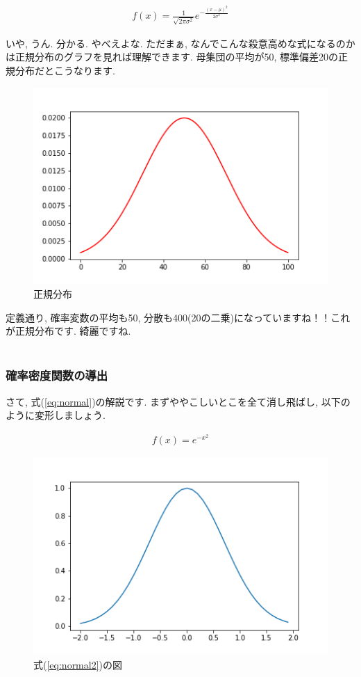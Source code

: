 \documentclass[11pt,a4paper,uplatex]{ujreport} 	%
\begin{document}
\begin{eqnarray}
\label{eq:normal}
f(x) = \frac{1}{\sqrt{2\pi\sigma^2}}e^{-\frac{(x-\mu)^2}{2\sigma^2}}
\end{eqnarray}

いや, うん. 分かる. やべえよな. ただまぁ, なんでこんな殺意高めな式になるのかは正規分布のグラフを見れば理解できます. 母集団の平均が50, 標準偏差20の正規分布だとこうなります.

\begin{figure}[H]
\label{im:normal}
  \centering
  \includegraphics[width=120mm,bb=0 0 432 288]{figures/normal.png}
  \caption{正規分布}
\end{figure}

定義通り, 確率変数の平均も50, 分散も400(20の二乗)になっていますね！！これが正規分布です. 綺麗ですね.\\
\\
\subsubsection{確率密度関数の導出}
さて, 式(\ref{eq:normal})の解説です. まずややこしいとこを全て消し飛ばし, 以下のように変形しましょう. 

\begin{eqnarray}
\label{eq:normal2}
f(x) = e^{-x^2}
\end{eqnarray}

\begin{figure}[H]
\label{im:normal}
  \centering
  \includegraphics[width=120mm,bb=0 0 432 288]{figures/normal2.png}
  \caption{式(\ref{eq:normal2})の図}
\end{figure}
\end{document}
